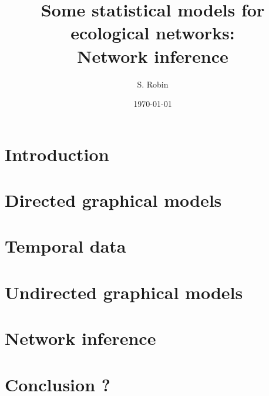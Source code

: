 \documentclass[9pt]{beamer}
\begin{document}
\title{Some statistical models for ecological networks: \\
  Network inference}
\author{S. Robin}
\date{\today}
\maketitle


\newcommand{\commonnodesize}{1.5em}
\renewcommand{\nodesize}{\commonnodesize}

\section{Introduction} 


\section[Directed graphical models]{Directed graphical models} 


\section{Temporal data} 


\section[Undirected graphical models]{Undirected graphical models} 


\section{Network inference} 


\section{Conclusion ?} 

\end{document}
